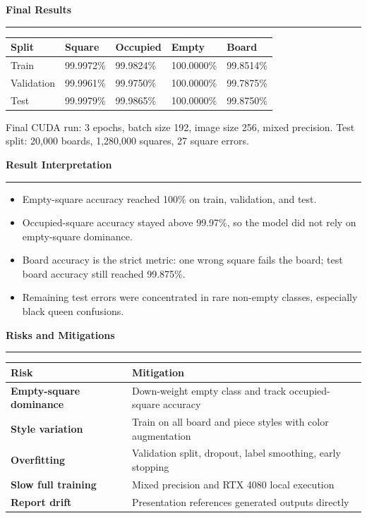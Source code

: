 \documentclass[aspectratio=169,10pt]{beamer}
\newcommand{\SlideTitle}[1]{%
  \vspace{0.2em}%
  {\titlefont\color{TitleBlack}\Large\bfseries #1}\par\vspace{0.35em}%
  {\color{Accent}\rule{0.16\paperwidth}{1.4pt}}\vspace{0.7em}%
}
\begin{document}
\begin{frame}
  \SlideTitle{Final Results}
  \begin{tabularx}{\textwidth}{@{}lXXXX@{}}
    \toprule
    \textbf{Split} & \textbf{Square} & \textbf{Occupied} & \textbf{Empty} & \textbf{Board} \\
    \midrule
    Train & 99.9972\% & 99.9824\% & 100.0000\% & 99.8514\% \\
    Validation & 99.9961\% & 99.9750\% & 100.0000\% & 99.7875\% \\
    Test & 99.9979\% & 99.9865\% & 100.0000\% & 99.8750\% \\
    \bottomrule
  \end{tabularx}
  \vspace{1em}
  {\color{BodyGrey}\small Final CUDA run: 3 epochs, batch size 192, image size 256, mixed precision. Test split: 20,000 boards, 1,280,000 squares, 27 square errors.}
\end{frame}

\begin{frame}
  \SlideTitle{Result Interpretation}
  \begin{itemize}
    \item Empty-square accuracy reached 100\% on train, validation, and test.
    \item Occupied-square accuracy stayed above 99.97\%, so the model did not rely on empty-square dominance.
    \item Board accuracy is the strict metric: one wrong square fails the board; test board accuracy still reached 99.875\%.
    \item Remaining test errors were concentrated in rare non-empty classes, especially black queen confusions.
  \end{itemize}
\end{frame}

\begin{frame}
  \SlideTitle{Risks and Mitigations}
  \begin{tabularx}{\textwidth}{@{}>{\bfseries\color{TitleBlack}}lX@{}}
    \toprule
    Risk & Mitigation \\
    \midrule
    Empty-square dominance & Down-weight empty class and track occupied-square accuracy \\
    Style variation & Train on all board and piece styles with color augmentation \\
    Overfitting & Validation split, dropout, label smoothing, early stopping \\
    Slow full training & Mixed precision and RTX 4080 local execution \\
    Report drift & Presentation references generated outputs directly \\
    \bottomrule
  \end{tabularx}
\end{frame}
\end{document}
